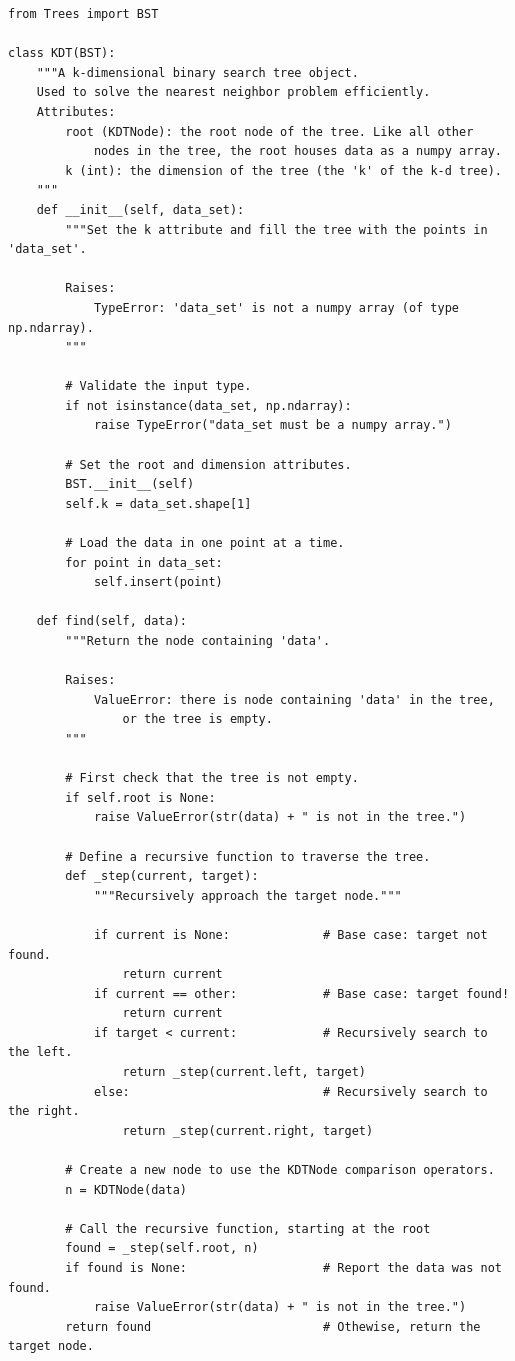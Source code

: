 \begin{lstlisting}
from Trees import BST

class KDT(BST):
    """A k-dimensional binary search tree object.
    Used to solve the nearest neighbor problem efficiently.
    Attributes:
        root (KDTNode): the root node of the tree. Like all other
            nodes in the tree, the root houses data as a numpy array.
        k (int): the dimension of the tree (the 'k' of the k-d tree).
    """
    def __init__(self, data_set):
        """Set the k attribute and fill the tree with the points in 'data_set'.

        Raises:
            TypeError: 'data_set' is not a numpy array (of type np.ndarray).
        """

        # Validate the input type.
        if not isinstance(data_set, np.ndarray):
            raise TypeError("data_set must be a numpy array.")

        # Set the root and dimension attributes.
        BST.__init__(self)
        self.k = data_set.shape[1]

        # Load the data in one point at a time.
        for point in data_set:
            self.insert(point)

	def find(self, data):
        """Return the node containing 'data'.
        
        Raises:
            ValueError: there is node containing 'data' in the tree,
                or the tree is empty.
        """

        # First check that the tree is not empty.
        if self.root is None:
            raise ValueError(str(data) + " is not in the tree.")
		
        # Define a recursive function to traverse the tree.
        def _step(current, target):
            """Recursively approach the target node."""
            
            if current is None:             # Base case: target not found.
                return current
            if current == other:            # Base case: target found!
                return current
            if target < current:            # Recursively search to the left.
                return _step(current.left, target)
            else:                           # Recursively search to the right.
                return _step(current.right, target)
        
        # Create a new node to use the KDTNode comparison operators.
        n = KDTNode(data)

        # Call the recursive function, starting at the root
        found = _step(self.root, n)
        if found is None:                   # Report the data was not found.
            raise ValueError(str(data) + " is not in the tree.")
        return found                        # Othewise, return the target node.
\end{lstlisting}


